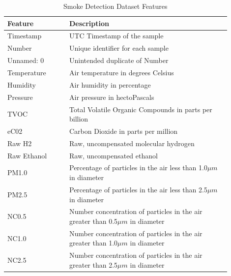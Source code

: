 \documentclass[conference]{IEEEtran}
\begin{document}
\begin{table}[ht]
    \begingroup
    \renewcommand{\arraystretch}{1.5} %
    \begin{tabular}{|p{0.25\linewidth}|p{0.65\linewidth}|}
        \hline
        \textbf{Feature} & \textbf{Description} \\
        \hline
        Timestamp & UTC Timestamp of the sample \\
        \hline
        Number & Unique identifier for each sample \\
        \hline
        Unnamed: 0 & Unintended duplicate of Number \\
        \hline
        Temperature & Air temperature in degrees Celsius \\
        \hline
        Humidity & Air humidity in percentage \\
        \hline
        Pressure & Air pressure in hectoPascals \\
        \hline
        TVOC & Total Volatile Organic Compounds in parts per billion \\
        \hline
        eC02 & Carbon Dioxide in parts per million \\
        \hline
        Raw H2 & Raw, uncompensated molecular hydrogen \\
        \hline
        Raw Ethanol & Raw, uncompensated ethanol \\
        \hline
        PM1.0 & Percentage of particles in the air less than 1.0$\mu m$ in diameter \\
        \hline
        PM2.5 & Percentage of particles in the air less than 2.5$\mu m$ in diameter \\
        \hline
        NC0.5 & Number concentration of particles in the air greater than 0.5$\mu m$ in diameter \\
        \hline
        NC1.0 & Number concentration of particles in the air greater than 1.0$\mu m$ in diameter \\
        \hline
        NC2.5 & Number concentration of particles in the air greater than 2.5$\mu m$ in diameter \\
        \hline
    \end{tabular}
    \vspace{1pt}
    \caption{Smoke Detection Dataset Features}
    \label{tab:features}
    \endgroup
\end{table}
\end{document}
